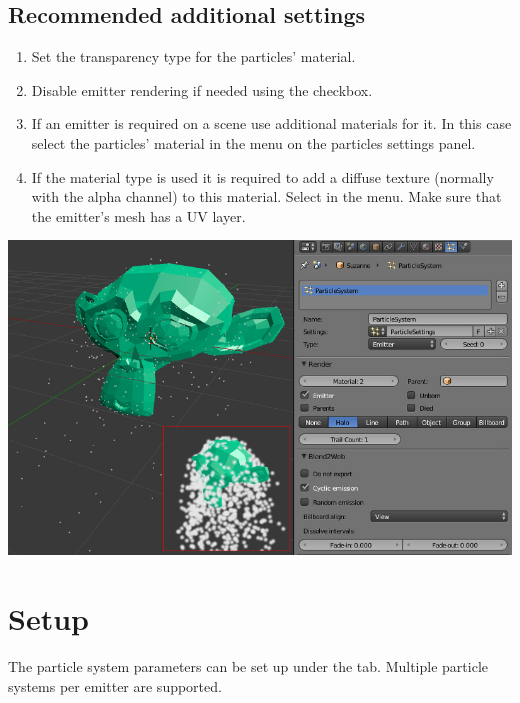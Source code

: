 \documentclass[a4paper,12pt,oneside]{sphinxmanual}
\begin{document}
\subsection{Recommended additional settings}
\label{particles:id4}\begin{enumerate}
\item {} 
Set the  transparency type for the particles' material.

\item {} 
Disable emitter rendering if needed using the  checkbox.

\item {} 
If an emitter is required on a scene use additional materials for it. In this case select the particles' material in the  menu on the particles settings panel.

\item {} 
If the  material type is used it is required to add a diffuse texture (normally with the alpha channel) to this material. Select   in the  menu.  Make sure that the emitter's mesh has a UV layer.

\end{enumerate}

{\hfill\includegraphics[width=1.000\linewidth]{particles_first_steps.jpg}\hfill}


\section{Setup}
\label{particles:id5}
The particle system parameters can be set up under the  tab. Multiple particle systems per emitter are supported.
\end{document}
